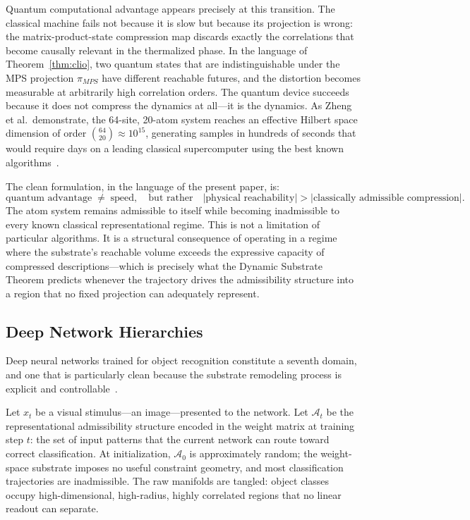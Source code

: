 \documentclass[12pt,a4paper]{article}
\begin{document}
Quantum computational advantage appears precisely at this transition. The classical machine fails not because it is slow but because its projection is wrong: the matrix-product-state compression map discards exactly the correlations that become causally relevant in the thermalized phase. In the language of Theorem~\ref{thm:clio}, two quantum states that are indistinguishable under the MPS projection $\pi_{MPS}$ have different reachable futures, and the distortion becomes measurable at arbitrarily high correlation orders. The quantum device succeeds because it does not compress the dynamics at all---it is the dynamics. As Zheng et al.\ demonstrate, the 64-site, 20-atom system reaches an effective Hilbert space dimension of order $\binom{64}{20} \approx 10^{15}$, generating samples in hundreds of seconds that would require days on a leading classical supercomputer using the best known algorithms~\cite{zheng2026}.

The clean formulation, in the language of the present paper, is:
\[
\text{quantum advantage} \;\neq\; \text{speed},
\quad \text{but rather} \quad
|\text{physical reachability}| > |\text{classically admissible compression}|.
\]
The atom system remains admissible to itself while becoming inadmissible to every known classical representational regime. This is not a limitation of particular algorithms. It is a structural consequence of operating in a regime where the substrate's reachable volume exceeds the expressive capacity of compressed descriptions---which is precisely what the Dynamic Substrate Theorem predicts whenever the trajectory drives the admissibility structure into a region that no fixed projection can adequately represent.

\subsection{Deep Network Hierarchies}

Deep neural networks trained for object recognition constitute a seventh domain, and one that is particularly clean because the substrate remodeling process is explicit and controllable~\cite{cohen2020}.

Let $x_t$ be a visual stimulus---an image---presented to the network. Let $\mathcal{A}_t$ be the representational admissibility structure encoded in the weight matrix at training step $t$: the set of input patterns that the current network can route toward correct classification. At initialization, $\mathcal{A}_0$ is approximately random; the weight-space substrate imposes no useful constraint geometry, and most classification trajectories are inadmissible. The raw manifolds are tangled: object classes occupy high-dimensional, high-radius, highly correlated regions that no linear readout can separate.
\end{document}
